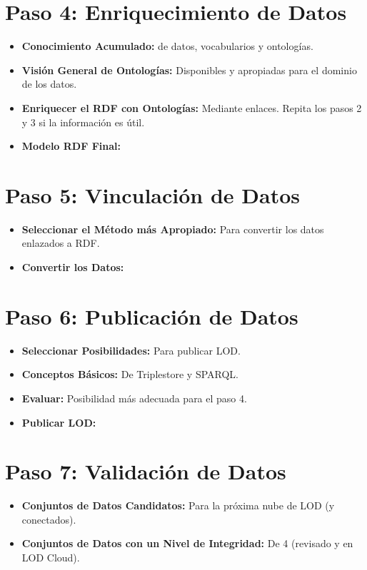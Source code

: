 \documentclass[11pt]{report}
\begin{document}
		\section{Paso 4: Enriquecimiento de Datos}
		\begin{itemize}
			\item \textbf{Conocimiento Acumulado:} de datos, vocabularios y ontologías.
			
			\item \textbf{Visión General de Ontologías:} Disponibles y apropiadas para el dominio de los datos.
			
			\item \textbf{Enriquecer el RDF con Ontologías:} Mediante enlaces. Repita los pasos 2 y 3 si la información es útil.
			
			\item \textbf{Modelo RDF Final:}
		\end{itemize}
		\section{Paso 5: Vinculación de Datos}
		\begin{itemize}
			\item \textbf{Seleccionar el Método más Apropiado:} Para convertir los datos enlazados a RDF.
			
			\item \textbf{Convertir los Datos:}
		\end{itemize}
		\section{Paso 6: Publicación de Datos}
		\begin{itemize}
			\item \textbf{Seleccionar Posibilidades:} Para publicar LOD.
			
			\item \textbf{Conceptos Básicos:} De Triplestore y SPARQL.
			
			\item \textbf{Evaluar:} Posibilidad más adecuada para el paso 4.
			
			\item \textbf{Publicar LOD:}
		\end{itemize}
		\section{Paso 7: Validación de Datos}
		\begin{itemize}
			\item \textbf{Conjuntos de Datos Candidatos:} Para la próxima nube de LOD (y conectados).
			
			\item \textbf{Conjuntos de Datos con un Nivel de Integridad:} De 4 (revisado y en LOD Cloud).
		\end{itemize}
\end{document}
